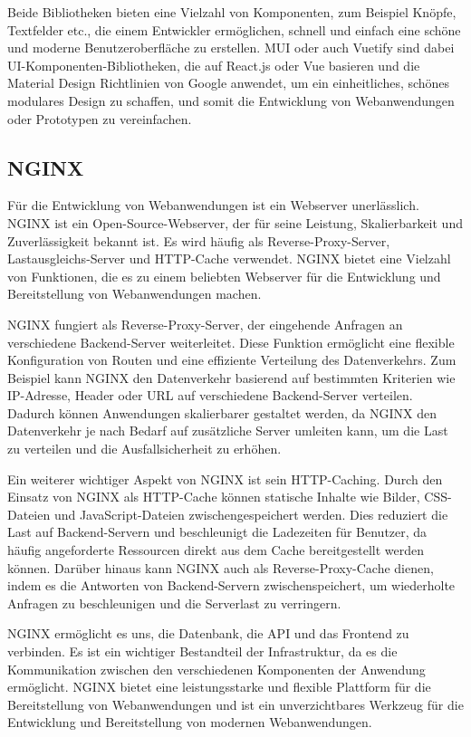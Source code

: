 Beide Bibliotheken bieten eine Vielzahl von Komponenten, zum Beispiel Knöpfe, Textfelder etc., die einem Entwickler ermöglichen, schnell und einfach eine schöne und moderne Benutzeroberfläche zu erstellen. \acf{MUI} oder auch Vuetify sind dabei \acs{UI}-Komponenten-Bibliotheken, die auf React.js oder Vue basieren und die Material Design Richtlinien von Google anwendet, um ein einheitliches, schönes modulares Design zu schaffen, und somit die Entwicklung von Webanwendungen oder Prototypen zu vereinfachen.\cite{materialui, vuetify}

\subsection{NGINX}

Für die Entwicklung von Webanwendungen ist ein Webserver unerlässlich. \acf{NGINX} ist ein Open-Source-Webserver, der für seine Leistung, Skalierbarkeit und Zuverlässigkeit bekannt ist. Es wird häufig als Reverse-Proxy-Server, Lastausgleichs-Server und HTTP-Cache verwendet. \acs{NGINX} bietet eine Vielzahl von Funktionen, die es zu einem beliebten Webserver für die Entwicklung und Bereitstellung von Webanwendungen machen.

\acs{NGINX} fungiert als Reverse-Proxy-Server, der eingehende Anfragen an verschiedene Backend-Server weiterleitet. Diese Funktion ermöglicht eine flexible Konfiguration von Routen und eine effiziente Verteilung des Datenverkehrs. Zum Beispiel kann \acs{NGINX} den Datenverkehr basierend auf bestimmten Kriterien wie IP-Adresse, Header oder URL auf verschiedene Backend-Server verteilen. Dadurch können Anwendungen skalierbarer gestaltet werden, da \acs{NGINX} den Datenverkehr je nach Bedarf auf zusätzliche Server umleiten kann, um die Last zu verteilen und die Ausfallsicherheit zu erhöhen.

Ein weiterer wichtiger Aspekt von \acs{NGINX} ist sein HTTP-Caching. Durch den Einsatz von \acs{NGINX} als HTTP-Cache können statische Inhalte wie Bilder, CSS-Dateien und JavaScript-Dateien zwischengespeichert werden. Dies reduziert die Last auf Backend-Servern und beschleunigt die Ladezeiten für Benutzer, da häufig angeforderte Ressourcen direkt aus dem Cache bereitgestellt werden können. Darüber hinaus kann \acs{NGINX} auch als Reverse-Proxy-Cache dienen, indem es die Antworten von Backend-Servern zwischenspeichert, um wiederholte Anfragen zu beschleunigen und die Serverlast zu verringern.

\acs{NGINX} ermöglicht es uns, die Datenbank, die \acs{API} und das Frontend zu verbinden. Es ist ein wichtiger Bestandteil der Infrastruktur, da es die Kommunikation zwischen den verschiedenen Komponenten der Anwendung ermöglicht. \acs{NGINX} bietet eine leistungsstarke und flexible Plattform für die Bereitstellung von Webanwendungen und ist ein unverzichtbares Werkzeug für die Entwicklung und Bereitstellung von modernen Webanwendungen. \cite{nginx}

